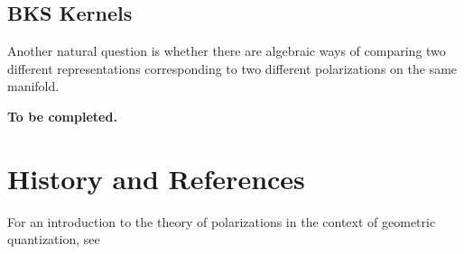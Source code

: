 \documentclass{tufte-handout}
\begin{document}
\subsection{BKS Kernels}
Another natural question is whether there are algebraic ways of comparing two different representations corresponding to two different polarizations on the same manifold.

\textbf{To be completed.}

\section{History and References}

For an introduction to the theory of polarizations in the context of geometric quantization, see %
\end{document}
